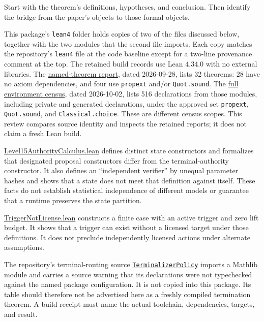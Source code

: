 \documentclass[
  11pt,
]{article}
\newcommand{\passthrough}[1]{#1}
\begin{document}
Start with the theorem's definitions, hypotheses, and conclusion. Then
identify the bridge from the paper's objects to those formal objects.

This package's \passthrough{\lstinline!lean4!} folder holds copies of
two of the files discussed below, together with the two modules that the
second file imports. Each copy matches the repository's
\passthrough{\lstinline!lean4!} file at the code baseline except for a
two-line provenance comment at the top. The retained build records use
Lean 4.34.0 with no external libraries. The
\href{lean4/axiom_report.txt}{named-theorem report}, dated 2026-09-28,
lists 32 theorems: 28 have no axiom dependencies, and four use
\passthrough{\lstinline!propext!} and/or
\passthrough{\lstinline!Quot.sound!}. The
\href{lean4/full_axiom_report.txt}{full environment census}, dated
2026-10-02, lists 516 declarations from those modules, including private
and generated declarations, under the approved set
\passthrough{\lstinline!propext!}, \passthrough{\lstinline!Quot.sound!},
and \passthrough{\lstinline!Classical.choice!}. These are different
census scopes. This review compares source identity and inspects the
retained reports; it does not claim a fresh Lean build.

\href{lean4/Level15AuthorityCalculus.lean}{Level15AuthorityCalculus.lean}
defines distinct state constructors and formalizes that designated
proposal constructors differ from the terminal-authority constructor. It
also defines an ``independent verifier'' by unequal parameter hashes and
shows that a state does not meet that definition against itself. These
facts do not establish statistical independence of different models or
guarantee that a runtime preserves the state partition.

\href{lean4/TriggerNotLicense.lean}{TriggerNotLicense.lean} constructs a
finite case with an active trigger and zero lift budget. It shows that a
trigger can exist without a licensed target under those definitions. It
does not preclude independently licensed actions under alternate
assumptions.

The repository's terminal-routing source
\href{https://github.com/dbccpage/the_symbol_game/blob/52cb5457f6c485ba548cfd292f6012a941ed22cf/lean4/TerminalizerPolicy.lean}{\passthrough{\lstinline!TerminalizerPolicy!}}
imports a Mathlib module and carries a source warning that its
declarations were not typechecked against the named package
configuration. It is not copied into this package. Its table should
therefore not be advertised here as a freshly compiled termination
theorem. A build receipt must name the actual toolchain, dependencies,
targets, and result.
\end{document}
